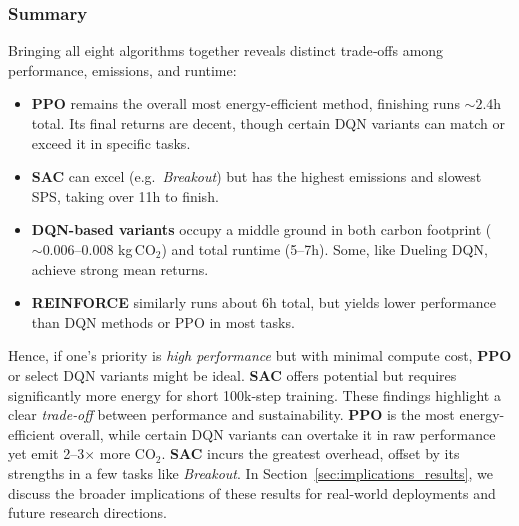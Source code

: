 \subsubsection{Summary}
Bringing all eight algorithms together reveals distinct trade‐offs among performance, 
emissions, and runtime:
\begin{itemize}
	\item \textbf{PPO} remains the overall most energy-efficient method, 
	finishing runs $\sim2.4$h total. Its final returns are decent, though 
	certain DQN variants can match or exceed it in specific tasks.
	\item \textbf{SAC} can excel (e.g.\ \emph{Breakout}) but has the highest 
	emissions and slowest SPS, taking over 11h to finish.
	\item \textbf{DQN-based variants} occupy a middle ground in both carbon 
	footprint ($\sim0.006$--0.008 kg\,CO$_2$) and total runtime (5--7h). 
	Some, like Dueling DQN, achieve strong mean returns.
	\item \textbf{REINFORCE} similarly runs about 6h total, but yields lower 
	performance than DQN methods or PPO in most tasks.
\end{itemize}
Hence, if one’s priority is \emph{high performance} but with minimal compute cost, 
\textbf{PPO} or select DQN variants might be ideal. \textbf{SAC} offers potential 
but requires significantly more energy for short 100k-step training. These findings 
highlight a clear \emph{trade‐off} between performance and sustainability. 
\textbf{PPO} is the most energy-efficient overall, while certain DQN variants can 
overtake it in raw performance yet emit 2--3$\times$ more CO$_2$. \textbf{SAC} 
incurs the greatest overhead, offset by its strengths in a few tasks like 
\emph{Breakout}. In Section~\ref{sec:implications_results}, we discuss the broader 
implications of these results for real-world deployments and future research directions.


